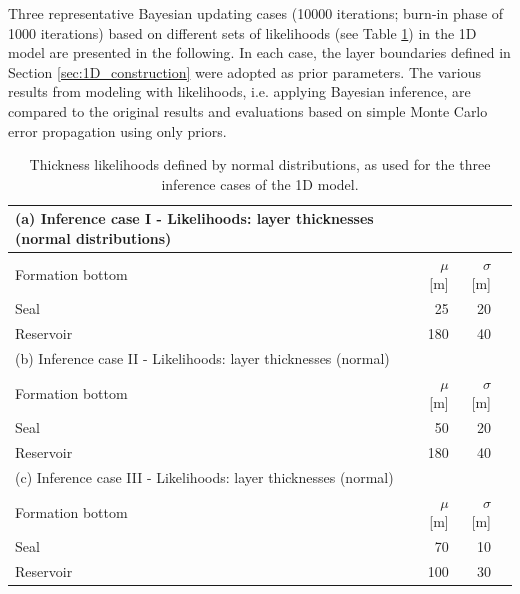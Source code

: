 			Three representative Bayesian updating cases (10000 iterations; burn-in phase of 1000 iterations) based on different sets of likelihoods (see Table \ref{tab:1D_likelihoods}) in the 1D model are presented in the following. In each case, the layer boundaries defined in Section \ref{sec:1D_construction} were adopted as prior parameters. The various results from modeling with likelihoods, i.e. applying Bayesian inference, are compared to the original results and evaluations based on simple Monte Carlo error propagation using only priors.
			\begin{table}[h]
				\centering
			\begin{tabular}{lrrr} 
				\toprule
				(a) Inference case I - Likelihoods: layer thicknesses (normal distributions)\\  
				\midrule 
				Formation bottom & $\mu$ [m] & $\sigma$ [m]\\ 
				\midrule 
				Seal & 25 & 20 \\
				Reservoir & 180 & 40 \\
				\bottomrule
				\toprule
				(b) Inference case II - Likelihoods: layer thicknesses (normal)\\
				\midrule 
				Formation bottom & $\mu$ [m] & $\sigma$ [m]\\ 
				\midrule 
				Seal & 50 & 20 \\
				Reservoir & 180 & 40 \\
				\bottomrule
				\toprule
				(c) Inference case III - Likelihoods: layer thicknesses (normal)\\
				\midrule 
				Formation bottom & $\mu$ [m] & $\sigma$ [m]\\ 
				\midrule 
				Seal & 70 & 10 \\
				Reservoir & 100 & 30 \\
				\bottomrule
			\end{tabular}
			\caption{Thickness likelihoods defined by normal distributions, as used for the three inference cases of the 1D model.}
			\label{tab:1D_likelihoods}
			\end{table}
				
